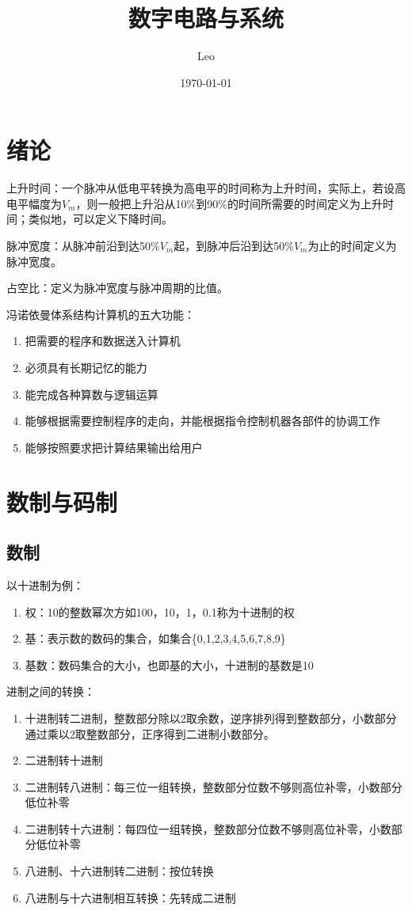 \documentclass{ctexart}
\title{数字电路与系统}
\author{Leo}
\date{\today}
\begin{document}
\maketitle
\tableofcontents
\section*{绪论}
上升时间：一个脉冲从低电平转换为高电平的时间称为上升时间，实际上，若设高电平幅度为$V_m$，则一般把上升沿从10\%到90\%的时间所需要的时间定义为上升时间；类似地，可以定义下降时间。

脉冲宽度：从脉冲前沿到达50\%$V_m$起，到脉冲后沿到达50\%$V_m$为止的时间定义为脉冲宽度。

占空比：定义为脉冲宽度与脉冲周期的比值。

冯诺依曼体系结构计算机的五大功能：
\begin{enumerate}
    \item 把需要的程序和数据送入计算机
    \item 必须具有长期记忆的能力
    \item 能完成各种算数与逻辑运算
    \item 能够根据需要控制程序的走向，并能根据指令控制机器各部件的协调工作
    \item 能够按照要求把计算结果输出给用户
\end{enumerate}

\section{数制与码制}
\subsection{数制}
以十进制为例：
\begin{enumerate}
    \item 权：10的整数幂次方如100，10，1，0.1称为十进制的权
    \item 基：表示数的数码的集合，如集合\{0,1,2,3,4,5,6,7,8,9\}
    \item 基数：数码集合的大小，也即基的大小，十进制的基数是10
\end{enumerate}
进制之间的转换：\
\begin{enumerate}
    \item 十进制转二进制，整数部分除以2取余数，逆序排列得到整数部分，小数部分通过乘以2取整数部分，正序得到二进制小数部分。{\color{red}{小数转换，保留的位数与原数字的有效数字一样，比如十进制保留两位小数，则二进制应该保留到1/100以后，即1/128，即7位小数}}
    \item 二进制转十进制
    \item 二进制转八进制：每三位一组转换，整数部分位数不够则高位补零，小数部分低位补零
    \item 二进制转十六进制：每四位一组转换，整数部分位数不够则高位补零，小数部分低位补零
    \item 八进制、十六进制转二进制：按位转换
    \item 八进制与十六进制相互转换：先转成二进制
\end{enumerate}
\end{document}

